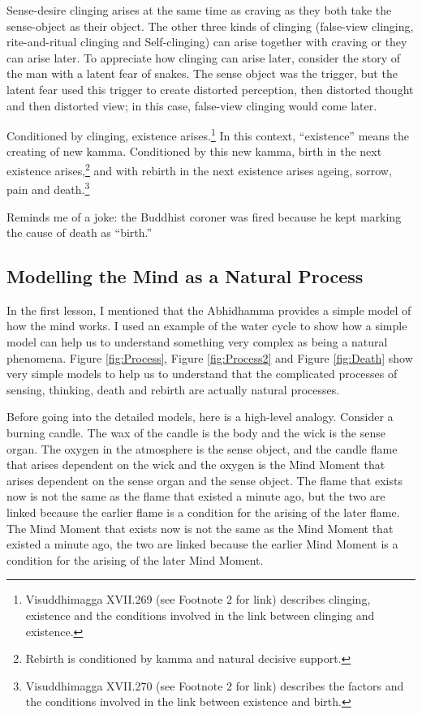 Sense-desire clinging arises at the same time as craving as they both take the sense-object as their object. The other three kinds of clinging (false-view clinging, rite-and-ritual clinging and Self-clinging) can arise together with craving or they can arise later. To appreciate how clinging can arise later, consider the story of the man with a latent fear of snakes. The sense object was the trigger, but the latent fear used this trigger to create distorted perception, then distorted thought and then distorted view; in this case, false-view clinging would come later.

Conditioned by clinging, existence arises.\footnote{Visuddhimagga XVII.269 (see Footnote 2 for link) describes clinging, existence and the conditions involved in the link between clinging and existence.} In this context, “existence” means the creating of new kamma. Conditioned by this new kamma, birth in the next existence arises,\footnote{Rebirth is conditioned by kamma and natural decisive support.} and with rebirth in the next existence arises ageing, sorrow, pain and death.\footnote{Visuddhimagga XVII.270 (see Footnote 2 for link) describes the factors and the conditions involved in the link between existence and birth.} 

Reminds me of a joke: the Buddhist coroner was fired because he kept marking the cause of death as “birth.” 

\subsection*{Modelling the Mind as a Natural Process}

In the first lesson, I mentioned that the Abhidhamma provides a simple model of how the mind works. I used an example of the water cycle to show how a simple model can help us to understand something very complex as being a natural phenomena. Figure \ref{fig:Process}, Figure \ref{fig:Process2} and Figure \ref{fig:Death} show very simple models to help us to understand that the complicated processes of sensing, thinking, death and rebirth are actually natural processes.

Before going into the detailed models, here is a high-level analogy. Consider a burning candle. The wax of the candle is the body and the wick is the sense organ. The oxygen in the atmosphere is the sense object, and the candle flame that arises dependent on the wick and the oxygen is the Mind Moment that arises dependent on the sense organ and the sense object. The flame that exists now is not the same as the flame that existed a minute ago, but the two are linked because the earlier flame is a condition for the arising of the later flame. The Mind Moment that exists now is not the same as the Mind Moment that existed a minute ago, the two are linked because the earlier Mind Moment is a condition for the arising of the later Mind Moment. 

